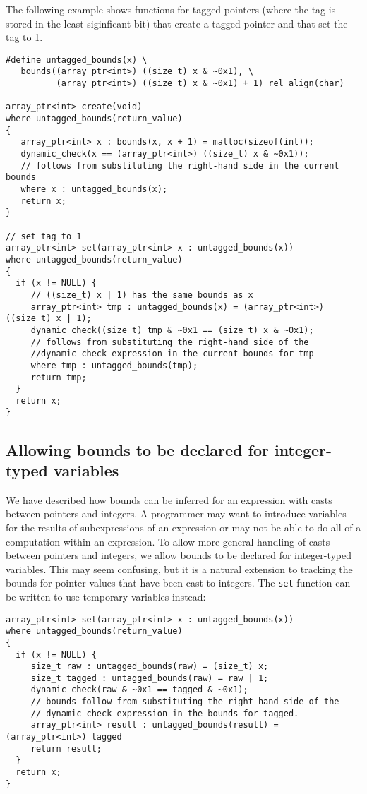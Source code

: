 The following example shows functions for tagged pointers
(where the tag is stored in the least siginficant bit) that
create a tagged pointer and that set the tag to 1.

\begin{lstlisting}
#define untagged_bounds(x) \
   bounds((array_ptr<int>) ((size_t) x & ~0x1), \
          (array_ptr<int>) ((size_t) x & ~0x1) + 1) rel_align(char)

array_ptr<int> create(void) 
where untagged_bounds(return_value)
{
   array_ptr<int> x : bounds(x, x + 1) = malloc(sizeof(int));
   dynamic_check(x == (array_ptr<int>) ((size_t) x & ~0x1));
   // follows from substituting the right-hand side in the current bounds
   where x : untagged_bounds(x); 
   return x;
}

// set tag to 1
array_ptr<int> set(array_ptr<int> x : untagged_bounds(x)) 
where untagged_bounds(return_value)
{
  if (x != NULL) {
     // ((size_t) x | 1) has the same bounds as x                   
     array_ptr<int> tmp : untagged_bounds(x) = (array_ptr<int>) ((size_t) x | 1);
     dynamic_check((size_t) tmp & ~0x1 == (size_t) x & ~0x1);
     // follows from substituting the right-hand side of the
     //dynamic check expression in the current bounds for tmp
     where tmp : untagged_bounds(tmp);
     return tmp;
  }
  return x;
}
\end{lstlisting}

\subsection{Allowing bounds to be declared for integer-typed variables}

We have described how bounds can be inferred for an expression with
casts between pointers and integers.  A programmer may want to
introduce variables for the results of subexpressions of an
expression or may not be able to do all of a computation within an expression.
To allow more general handling of casts between pointers and
integers, we allow bounds to be declared for integer-typed variables.
This may seem confusing, but it is a natural extension to tracking the
bounds for pointer values that have been cast to integers.   The \lstinline+set+
function can be written to use temporary variables instead:
\begin{lstlisting}
array_ptr<int> set(array_ptr<int> x : untagged_bounds(x))
where untagged_bounds(return_value)
{
  if (x != NULL) {
     size_t raw : untagged_bounds(raw) = (size_t) x;
     size_t tagged : untagged_bounds(raw) = raw | 1;
     dynamic_check(raw & ~0x1 == tagged & ~0x1);
     // bounds follow from substituting the right-hand side of the
     // dynamic check expression in the bounds for tagged.
     array_ptr<int> result : untagged_bounds(result) = (array_ptr<int>) tagged
     return result;
  }
  return x;
}
\end{lstlisting}

